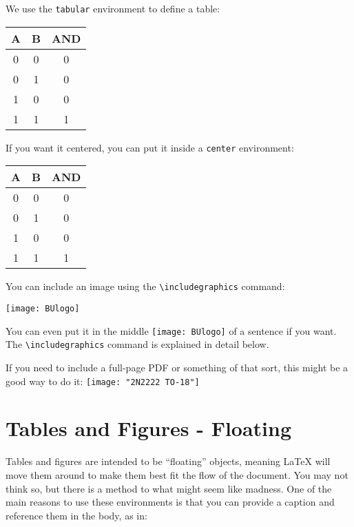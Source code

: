 \documentclass[11pt]{article}
\begin{document}
We use the \texttt{tabular} environment to define a table:

\begin{tabular}{cc|c}
	\toprule
	A & B & AND \\
	\midrule
	0 & 0 & 0 \\
	0 & 1 & 0 \\
	1 & 0 & 0 \\
	1 & 1 & 1 \\
	\bottomrule
\end{tabular} 

If you want it centered, you can put it inside a \texttt{center} environment:

\begin{center}
	\begin{tabular}{cc|c}
		\toprule
		A & B & AND \\
		\midrule
		0 & 0 & 0 \\
		0 & 1 & 0 \\
		1 & 0 & 0 \\
		1 & 1 & 1 \\
		\bottomrule
	\end{tabular} 
\end{center}

You can include an image using the \verb|\includegraphics| command:

\begin{center}
	\texttt{[image: BUlogo]}
\end{center}

You can even put it in the middle \texttt{[image: BUlogo]}
of a sentence if you want. The \verb|\includegraphics| command is explained in detail below.

If you need to include a full-page PDF or something of that sort, this might be a good way to do it:
\texttt{[image: "2N2222 TO-18"]}


\section*{Tables and Figures - Floating}

Tables and figures are intended to be ``floating'' objects, meaning LaTeX will move them around to make them best fit the flow of the document.  You may not think so, but there is a method to what might seem like madness. One of the main reasons to use these environments is that you can provide a caption and reference them in the body, as in: 
\end{document}

